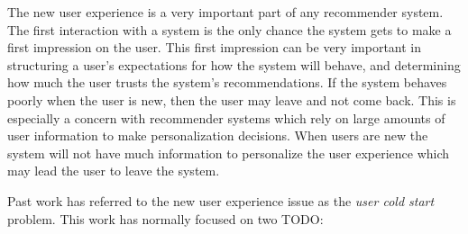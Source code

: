 \documentclass[letterpaper]{sig-alternate}
\begin{document}
  The new user experience is a very important part of any recommender system.
  The first interaction with a system is the only chance the system gets to make a first impression on the user.
  This first impression can be very important in structuring a user's expectations for how the system will behave, and determining how much the user trusts the system's recommendations.
  If the system behaves poorly when the user is new, then the user may leave and not come back.
  This is especially a concern with recommender systems which rely on large amounts of user information to make personalization decisions.
  When users are new the system will not have much information to personalize the user experience which may lead the user to leave the system.
  

  Past work has referred to the new user experience issue as the \emph{user cold start} problem.
  This work has normally focused on two
TODO:

\end{document}
